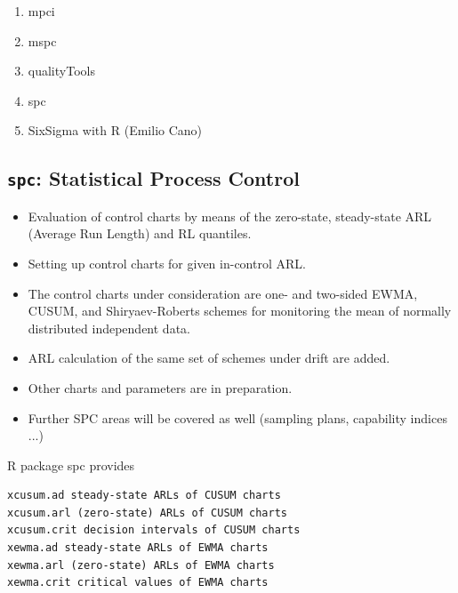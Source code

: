 \documentclass[MASTER-SPC.tex]{subfiles}
\begin{document}
\begin{enumerate}
\item mpci
\item mspc
\item qualityTools
\item spc
\item SixSigma with R (Emilio Cano)
\end{enumerate}


\newpage
\subsection{ \texttt{spc}: Statistical Process Control }


\begin{itemize}
\item Evaluation of control charts by means of the zero-state, steady-state ARL (Average Run Length) and RL quantiles. 

\item Setting up control charts for given in-control ARL. 

\item The control charts under consideration are one- and two-sided EWMA, CUSUM, and Shiryaev-Roberts schemes for monitoring the mean of normally distributed independent data. 

\item
ARL calculation of the same set of schemes under drift are added. 

\item Other charts and parameters are in preparation. 

\item Further SPC areas will be covered as well (sampling plans, capability indices ...)
\end{itemize}


R package spc provides

\begin{verbatim}
xcusum.ad steady-state ARLs of CUSUM charts
xcusum.arl (zero-state) ARLs of CUSUM charts
xcusum.crit decision intervals of CUSUM charts
xewma.ad steady-state ARLs of EWMA charts
xewma.arl (zero-state) ARLs of EWMA charts
xewma.crit critical values of EWMA charts
\end{verbatim}
\end{document}

